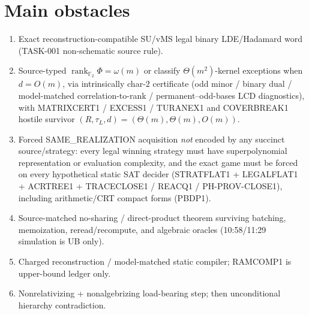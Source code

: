 \documentclass[11pt]{article}
\begin{document}
\section*{Main obstacles}
\begin{enumerate}
\item Exact reconstruction-compatible SU/vMS legal binary LDE/Hadamard word (TASK-001
non-schematic source rule).
\item Source-typed $\operatorname{rank}_{\mathbb F_2}\Phi=\omega(m)$ or classify
$\Theta(m^2)$-kernel exceptions when $d=O(m)$, via intrinsically char-$2$ certificate
(odd minor / binary dual / model-matched correlation-to-rank / permanent--odd-bases LCD
diagnostics), with MATRIXCERT1 / EXCESS1 / TURANEX1 and COVERBREAK1 hostile survivor
$(R,\tau_L,d)=(\Theta(m),\Theta(m),O(m))$.
\item Forced SAME\_REALIZATION acquisition \emph{not} encoded by any succinct source/strategy:
every legal winning strategy must have superpolynomial representation or evaluation complexity,
and the exact game must be forced on every hypothetical static SAT decider
(STRATFLAT1 + LEGALFLAT1 + ACRTREE1 + TRACECLOSE1 / REACQ1 / PH-PROV-CLOSE1),
including arithmetic/CRT compact forms (PBDP1).
\item Source-matched no-sharing / direct-product theorem surviving batching, memoization,
reread/recompute, and algebraic oracles (10:58/11:29 simulation is UB only).
\item Charged reconstruction / model-matched static compiler; RAMCOMP1 is upper-bound ledger only.
\item Nonrelativizing + nonalgebrizing load-bearing step; then unconditional hierarchy contradiction.
\end{enumerate}
\end{document}
